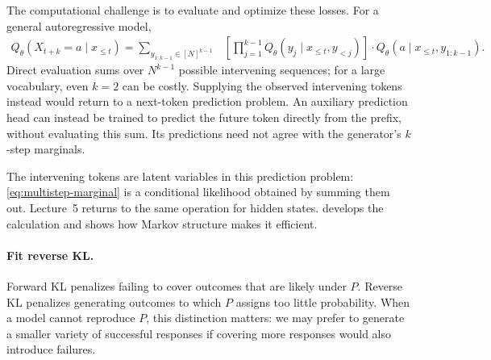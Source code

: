 \documentclass[11pt,twoside]{article}
\theoremstyle{definition}
\theoremstyle{remark}
\begin{document}
The computational challenge is to evaluate and optimize these losses.
For a general autoregressive model,
\begin{equation}
\begin{split}
 Q_\theta(X_{t+k}=a\mid x_{\le t})
 =\sum_{y_{1:k-1}\in[N]^{k-1}}
 &\left[\prod_{j=1}^{k-1}
 Q_\theta(y_j\mid x_{\le t},y_{<j})\right]
 \cdot Q_\theta(a\mid x_{\le t},y_{1:k-1}).
\end{split}
\label{eq:multistep-marginal}
\end{equation}
Direct evaluation sums over \(N^{k-1}\) possible intervening sequences;
for a large vocabulary, even \(k=2\) can be costly.
Supplying the observed intervening tokens instead would return to a
next-token prediction problem. An auxiliary prediction head can instead
be trained to predict the future token directly from the prefix, without
evaluating this sum. Its predictions need not agree with the generator's
\(k\)-step marginals.\label{en:multistep-heads}

The intervening tokens are latent variables in this prediction problem:
\cref{eq:multistep-marginal} is a conditional likelihood obtained by
summing them out. Lecture~5 returns to the same
operation for hidden states.  develops the calculation
and shows how Markov structure makes it efficient.

\paragraph{Fit reverse KL.}
\label{sec:reverse-kl}

Forward KL penalizes failing to cover outcomes that are likely under \(P\).
Reverse KL penalizes generating outcomes to which \(P\) assigns too little
probability. When a model cannot reproduce \(P\), this distinction matters:
we may prefer to generate a smaller variety of successful responses if
covering more responses would also introduce failures.
\end{document}
